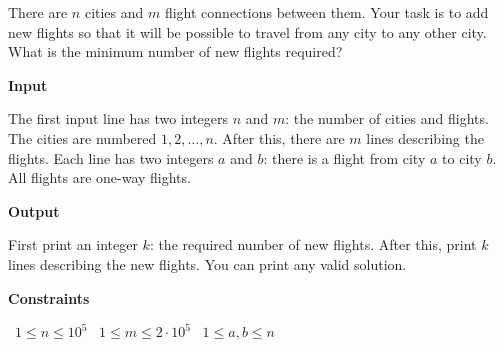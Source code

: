 There are $n$ cities and $m$ flight connections between them. Your task is to add new flights so that it will be possible to travel from any city to any other city. What is the minimum number of new flights required?

\vspace{0.3cm}\noindent\textbf{Input}

The first input line has two integers $n$ and $m$: the number of cities and flights. The cities are numbered $1,2,\dots,n$.
After this, there are $m$ lines describing the flights. Each line has two integers $a$ and $b$: there is a flight from city $a$ to city $b$. All flights are one-way flights.

\vspace{0.3cm}\noindent\textbf{Output}

First print an integer $k$: the required number of new flights. After this, print $k$ lines describing the new flights. You can print any valid solution.

\vspace{0.3cm}\noindent\textbf{Constraints}

\textbullet\ $1 \le n \le 10^5$
\textbullet\ $1 \le m \le 2 \cdot 10^5$
\textbullet\ $1 \le a,b \le n$